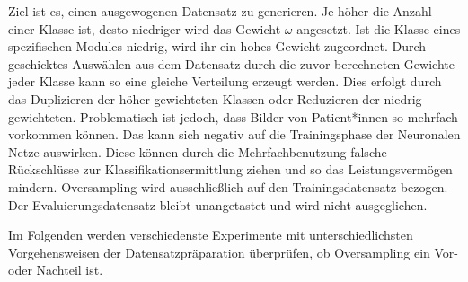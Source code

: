 Ziel ist es, einen ausgewogenen Datensatz zu generieren. Je höher die Anzahl einer Klasse ist, desto niedriger wird das Gewicht $\omega$ angesetzt. Ist die Klasse eines spezifischen Modules niedrig, wird ihr ein hohes Gewicht zugeordnet. Durch geschicktes Auswählen aus dem Datensatz durch die zuvor berechneten Gewichte jeder Klasse kann so eine gleiche Verteilung erzeugt werden. Dies erfolgt durch das Duplizieren der höher gewichteten Klassen oder Reduzieren der niedrig gewichteten. Problematisch ist jedoch, dass Bilder von Patient*innen so mehrfach vorkommen können. Das kann sich negativ auf die Trainingsphase der Neuronalen Netze auswirken. Diese können durch die Mehrfachbenutzung falsche Rückschlüsse zur Klassifikationsermittlung ziehen und so das Leistungsvermögen mindern. Oversampling wird ausschließlich auf den Trainingsdatensatz bezogen. Der Evaluierungsdatensatz bleibt unangetastet und wird nicht ausgeglichen.

Im Folgenden werden verschiedenste Experimente mit unterschiedlichsten Vorgehensweisen der Datensatzpräparation überprüfen, ob Oversampling ein Vor- oder Nachteil ist.

